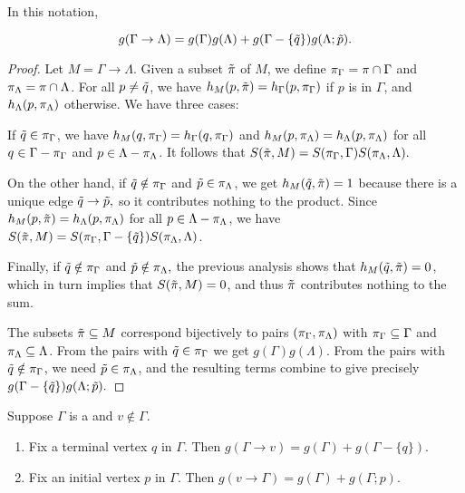 \begin{prop}
	In this notation,
	\begin{enumrealm}\begin{equation*}
		g(\Gamma \to \Lambda) = g(\Gamma)g(\Lambda) + g(\Gamma - \{\tilde{q}\})g(\Lambda; \tilde{p}).
	\end{equation*}\end{enumrealm}
\end{prop}
\begin{proof}
	Let $M = \Gamma \to \Lambda$.
	Given a subset $\tilde{\pi}$ of $M$, we define $\pi_\Gamma = \pi \cap \Gamma$ and $\pi_\Lambda = \pi \cap \Lambda$.
	For all $p \neq \tilde{q}$, we have $h_M(p, \tilde{\pi}) = h_\Gamma(p, \pi_\Gamma)$ if $p$ is in $\Gamma$, and $h_\Lambda(p, \pi_\Lambda)$ otherwise.
	We have three cases:

	If $\tilde{q} \in \pi_\Gamma$, we have $h_M(q, \pi_\Gamma) = h_\Gamma(q, \pi_\Gamma)$
	and $h_M(p, \pi_\Lambda) = h_\Lambda(p, \pi_\Lambda)$ for all $q \in \Gamma - \pi_\Gamma$ and $p \in \Lambda - \pi_\Lambda$.
	It follows that $S(\tilde{\pi}, M) = S(\pi_\Gamma, \Gamma)S(\pi_\Lambda, \Lambda).$
	
	On the other hand, if $\tilde{q}\notin\pi_\Gamma$ and $\tilde{p} \in \pi_\Lambda$, we get $h_M(\tilde{q}, \tilde{\pi}) = 1$
	because there is a unique edge $\tilde{q} \to \tilde{p},$ so it contributes nothing to the product.
	Since $h_M(p, \tilde{\pi}) = h_\Lambda(p, \pi_\Lambda)$ for all $p \in \Lambda - \pi_\Lambda$,
	we have $S(\tilde{\pi}, M) = S(\pi_\Gamma, \Gamma - \{\tilde{q}\})S(\pi_\Lambda, \Lambda)$.
	
	Finally, if $\tilde{q} \notin \pi_\Gamma$ and $\tilde{p}\notin\pi_\Lambda,$ the previous analysis shows that $h_M(\tilde{q}, \tilde{\pi}) = 0$,
	which in turn implies that $S(\tilde{\pi}, M) = 0$, and thus $\tilde{\pi}$ contributes nothing to the sum.
	
	The subsets $\tilde{\pi} \subseteq M$ correspond bijectively to pairs $(\pi_\Gamma, \pi_\Lambda)$
	with $\pi_\Gamma \subseteq \Gamma$ and $\pi_\Lambda \subseteq \Lambda$.
	From the pairs with $\tilde{q} \in \pi_\Gamma$ we get $g(\Gamma)g(\Lambda)$.
	From the pairs with $\tilde{q} \notin \pi_\Gamma$, we need $\tilde{p} \in \pi_\Lambda$,
	and the resulting terms combine to give precisely $g(\Gamma - \{\tilde{q}\})g(\Lambda; \tilde{p}).$
\end{proof}

\begin{cor} Suppose $\Gamma$ is a  and $v \notin \Gamma$.\listspace
	\begin{enumerate} \listspace
		\item Fix a terminal vertex $q$ in $\Gamma$.
Then $g(\Gamma \to v) = g(\Gamma) + g(\Gamma - \{q\}).$
		\item Fix an initial vertex $p$ in $\Gamma$.
Then $g(v \to \Gamma) = g(\Gamma) + g(\Gamma; p).$
	\end{enumerate}\textspace
\end{cor}


